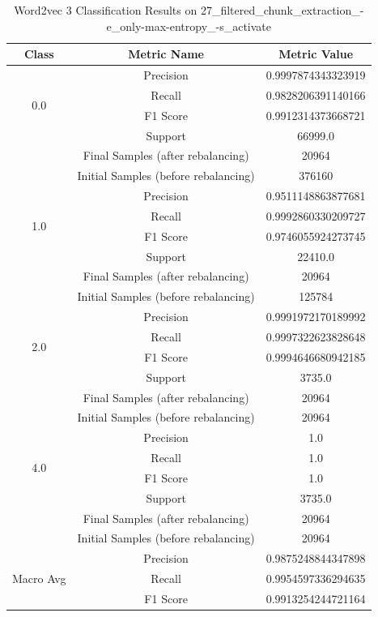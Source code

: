 \begin{longtable}{|c|c|c|}
\caption{Word2vec 3 Classification Results on 27\_filtered\_chunk\_extraction\_-e\_only-max-entropy\_-s\_activate} \label{tab:27_filtered_chunk_extraction_-e_only-max-entropy_-s_activate_word2vec_3_classifiers_results} \\
\hline
Class & Metric Name & Metric Value \\
\hline
\multirow{4}{*}{0.0} & Precision & 0.9997874343323919 \\
 & Recall & 0.9828206391140166 \\
 & F1 Score & 0.9912314373668721 \\
 & Support & 66999.0 \\
 & Final Samples (after rebalancing) & 20964 \\
 & Initial Samples (before rebalancing) & 376160 \\
\hline
\multirow{4}{*}{1.0} & Precision & 0.9511148863877681 \\
 & Recall & 0.9992860330209727 \\
 & F1 Score & 0.9746055924273745 \\
 & Support & 22410.0 \\
 & Final Samples (after rebalancing) & 20964 \\
 & Initial Samples (before rebalancing) & 125784 \\
\hline
\multirow{4}{*}{2.0} & Precision & 0.9991972170189992 \\
 & Recall & 0.9997322623828648 \\
 & F1 Score & 0.9994646680942185 \\
 & Support & 3735.0 \\
 & Final Samples (after rebalancing) & 20964 \\
 & Initial Samples (before rebalancing) & 20964 \\
\hline
\multirow{4}{*}{4.0} & Precision & 1.0 \\
 & Recall & 1.0 \\
 & F1 Score & 1.0 \\
 & Support & 3735.0 \\
 & Final Samples (after rebalancing) & 20964 \\
 & Initial Samples (before rebalancing) & 20964 \\
\hline
\multirow{4}{*}{Macro Avg} & Precision & 0.9875248844347898 \\
 & Recall & 0.9954597336294635 \\
 & F1 Score & 0.9913254244721164 \\

\end{longtable}
